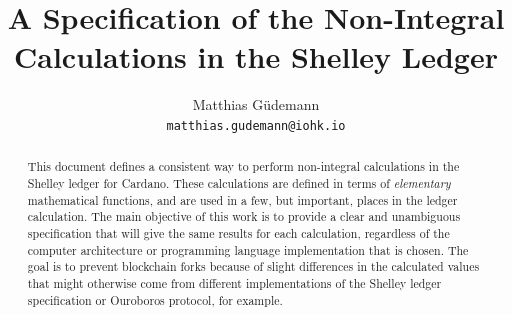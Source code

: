 \documentclass[11pt,a4paper,dvipsnames,twosided]{article}
\theoremstyle{definition}
\theoremstyle{definition}
\begin{document}



\cleardoublepage
\renewcommand{\thepage}{\arabic{page}}
\setcounter{page}{1}

\title{A Specification of the Non-Integral Calculations in the Shelley Ledger}

\author{Matthias G\"udemann  \\ {\small \texttt{matthias.gudemann@iohk.io}}}


\maketitle

\begin{abstract}
  This document defines a consistent way to perform non-integral calculations in
  the Shelley ledger for Cardano. These calculations are defined in terms of
  \emph{elementary} mathematical functions, and are used in a few, but
  important, places in the ledger calculation.  The main objective of this work
  is to provide a clear and unambiguous specification that will give the same
  results for each calculation, regardless of the computer architecture or
  programming language implementation that is chosen.  The goal is to prevent
  blockchain forks because of slight differences in the calculated values that
  might otherwise come from different implementations of the Shelley ledger
  specification or Ouroboros protocol, for example.
\end{abstract}
\end{document}
